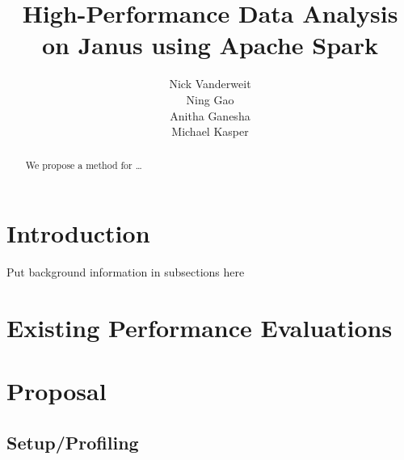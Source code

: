 \documentclass{article}
\title{High-Performance Data Analysis on Janus using Apache Spark}
\author{Nick Vanderweit \\
        Ning Gao \\
        Anitha Ganesha \\
        Michael Kasper}
\begin{document}
\maketitle

\begin{abstract}
We propose a method for \ldots
\end{abstract}

\section*{Introduction}
Put background information in subsections here \cite{fenn-dtk2006b}


\section*{Existing Performance Evaluations }

\section*{Proposal}

\subsection*{Setup/Profiling}
\end{document}
